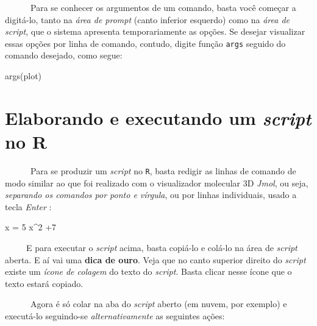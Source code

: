 \documentclass[
  letterpaper,
  DIV=11,
  numbers=noendperiod]{scrreprt}
\newenvironment{Shaded}{\begin{snugshade}}{\end{snugshade}}
\newcommand{\DecValTok}[1]{\textcolor[rgb]{0.68,0.00,0.00}{#1}}
\newcommand{\FunctionTok}[1]{\textcolor[rgb]{0.28,0.35,0.67}{#1}}
\newcommand{\NormalTok}[1]{\textcolor[rgb]{0.00,0.23,0.31}{#1}}
\newcommand{\OtherTok}[1]{\textcolor[rgb]{0.00,0.23,0.31}{#1}}
\newcommand{\SpecialCharTok}[1]{\textcolor[rgb]{0.37,0.37,0.37}{#1}}
\begin{document}
~~~~~~Para se conhecer os argumentos de um comando, basta você começar a
digitá-lo, tanto na \emph{área de prompt} (canto inferior esquerdo) como
na \emph{área de script}, que o sistema apresenta temporariamente as
opções. Se desejar visualizar essas opções por linha de comando,
contudo, digite função \texttt{args} seguido do comando desejado, como
segue:

\begin{Shaded}
\begin{Highlighting}[]
\FunctionTok{args}\NormalTok{(plot)}
\end{Highlighting}
\end{Shaded}

\section{\texorpdfstring{Elaborando e executando um \emph{script} no
R}{Elaborando e executando um script no R}}\label{elaborando-e-executando-um-script-no-r}

~~~~~~Para se produzir um \emph{script} no \texttt{R}, basta redigir as
linhas de comando de modo similar ao que foi realizado com o
visualizador molecular 3D \emph{Jmol}, ou seja, \emph{separando os
comandos por ponto e vírgula}, ou por linhas individuais, usado a tecla
\emph{Enter} :

\begin{Shaded}
\begin{Highlighting}[]
\NormalTok{x }\OtherTok{=} \DecValTok{5}
\NormalTok{x}\SpecialCharTok{\^{}}\DecValTok{2} \SpecialCharTok{+}\DecValTok{7}
\end{Highlighting}
\end{Shaded}

~~~~~E para executar o \emph{script} acima, basta copiá-lo e colá-lo na
área de \emph{script} aberta. E aí vai uma \textbf{dica de ouro}. Veja
que no canto superior direito do \emph{script} existe um \emph{ícone de
colagem} do texto do \emph{script}. Basta clicar nesse ícone que o texto
estará copiado.

~~~~~~Agora é só colar na aba do \emph{script} aberto (em nuvem, por
exemplo) e executá-lo seguindo-se \emph{alternativamente} as seguintes
ações:
\end{document}
